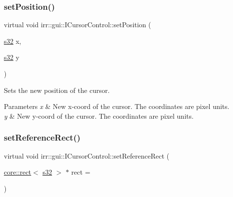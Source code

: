 \subsubsection{\texorpdfstring{set\+Position()}{setPosition()}\hspace{0.1cm}{\footnotesize\ttfamily [8/8]}}
{\footnotesize\ttfamily virtual void irr\+::gui\+::\+I\+Cursor\+Control\+::set\+Position (\begin{DoxyParamCaption}\item[{\hyperlink{namespaceirr_ac66849b7a6ed16e30ebede579f9b47c6}{s32}}]{x,  }\item[{\hyperlink{namespaceirr_ac66849b7a6ed16e30ebede579f9b47c6}{s32}}]{y }\end{DoxyParamCaption})\hspace{0.3cm}{\ttfamily [pure virtual]}}



Sets the new position of the cursor. 


\begin{DoxyParams}{Parameters}
{\em x} & New x-\/coord of the cursor. The coordinates are pixel units. \\
\hline
{\em y} & New y-\/coord of the cursor. The coordinates are pixel units. \\
\hline
\end{DoxyParams}
\mbox{\label{classirr_1_1gui_1_1ICursorControl_a2a7428ef716a60f8f4b86361a69b8770}} 
\subsubsection{\texorpdfstring{set\+Reference\+Rect()}{setReferenceRect()}\hspace{0.1cm}{\footnotesize\ttfamily [1/2]}}
{\footnotesize\ttfamily virtual void irr\+::gui\+::\+I\+Cursor\+Control\+::set\+Reference\+Rect (\begin{DoxyParamCaption}\item[{\hyperlink{classirr_1_1core_1_1rect}{core\+::rect}$<$ \hyperlink{namespaceirr_ac66849b7a6ed16e30ebede579f9b47c6}{s32} $>$ $\ast$}]{rect = {} }\end{DoxyParamCaption})\hspace{0.3cm}{\ttfamily [pure virtual]}}



